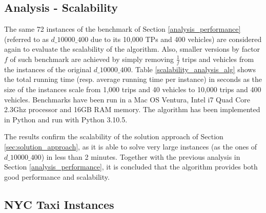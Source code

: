 \subsection{Analysis - Scalability}
\label{analysis_scalability}

The same 72 instances of the benchmark of Section \ref{analysis_performance} (referred to as $d\_10000\_400$ due to its 10,000 TPs and 400 vehicles) are considered again to evaluate the scalability of the algorithm. 
Also, smaller versions by factor $f$ of such benchmark are achieved by simply removing $\frac{1}{f}$ trips and vehicles from the instances of the original $d\_10000\_400$.  Table \ref{scalability_analysis_alg} shows the total running time (resp. average running time per instance) in seconds as the size of the instances scale from 1,000 trips and 40 vehicles to 10,000 trips and 400 vehicles.  Benchmarks have been run in a Mac OS Ventura, Intel i7 Quad Core 2.3Ghz processor
and 16GB RAM memory.  The algorithm has been implemented in Python and run with Python 3.10.5. 

The results confirm the scalability of the solution approach of Section \ref{sec:solution_approach}, as it is able to solve very large instances (as the ones of $d\_10000\_400$) in less than 2 minutes.  Together with the previous analysis in Section \ref{analysis_performance}, it is concluded that the algorithm provides both good performance and scalability.  


%

\subsection{NYC Taxi Instances}
\label{sec:instances}

